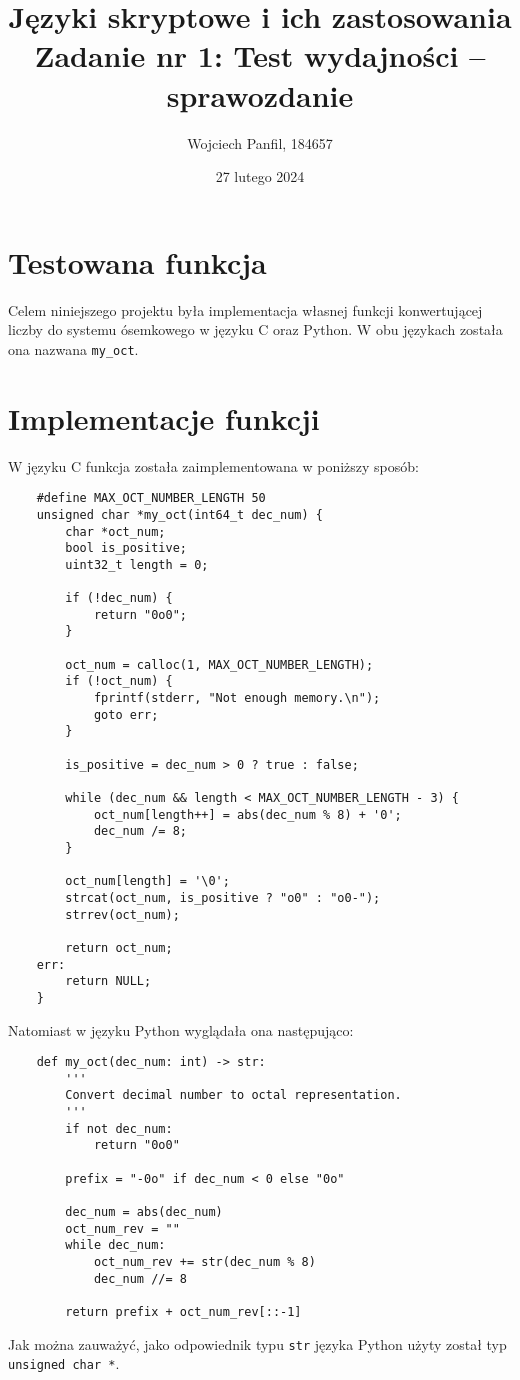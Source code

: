 \documentclass[11pt]{article}
\title{
	\textbf{Języki skryptowe i ich zastosowania}\\
	Zadanie nr 1: Test wydajności -- sprawozdanie}
\author{Wojciech Panfil, 184657}
\date{27 lutego 2024}
\begin{document}
	\maketitle
	
	\section{Testowana funkcja}
	Celem niniejszego projektu była implementacja własnej funkcji
	konwertującej liczby do systemu ósemkowego w języku C oraz Python.
	W obu językach została ona nazwana \texttt{my\_oct}.

	\section{Implementacje funkcji}
	W języku C funkcja została zaimplementowana w poniższy sposób:
	\begin{lstlisting}
	#define MAX_OCT_NUMBER_LENGTH 50
	unsigned char *my_oct(int64_t dec_num) {
		char *oct_num;
		bool is_positive;
		uint32_t length = 0;
		
		if (!dec_num) {
			return "0o0";
		}

		oct_num = calloc(1, MAX_OCT_NUMBER_LENGTH);
		if (!oct_num) {
			fprintf(stderr, "Not enough memory.\n");
			goto err;
		}

		is_positive = dec_num > 0 ? true : false;

		while (dec_num && length < MAX_OCT_NUMBER_LENGTH - 3) {
			oct_num[length++] = abs(dec_num % 8) + '0';
			dec_num /= 8;
		}

		oct_num[length] = '\0';
		strcat(oct_num, is_positive ? "o0" : "o0-");
		strrev(oct_num);

		return oct_num;
	err:
		return NULL;
	}
	\end{lstlisting}

	Natomiast w języku Python wyglądała ona następująco:

	\begin{lstlisting}
	def my_oct(dec_num: int) -> str:
		'''
		Convert decimal number to octal representation.
		'''
		if not dec_num:
			return "0o0"

		prefix = "-0o" if dec_num < 0 else "0o"

		dec_num = abs(dec_num)
		oct_num_rev = ""
		while dec_num:
			oct_num_rev += str(dec_num % 8)
			dec_num //= 8

		return prefix + oct_num_rev[::-1]
	\end{lstlisting}
	
	Jak można zauważyć, jako odpowiednik typu \texttt{str} języka Python użyty został typ \texttt{unsigned char *}.
\end{document}
